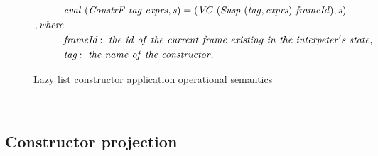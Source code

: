 \documentclass[diploma]{softlab-thesis}
\begin{document}
\begin{figure}[h]
  \begin{align*}
    & \mathit{eval \hfill\ (ConstrF \hfill\ tag \hfill\ exprs, s) = (VC \hfill\ (Susp \hfill\ (tag, exprs) \hfill\ frameId), s)} \\
    \mathit{, where} \\
    &  \mathit{\textit{frameId}: \hfill\ the \hfill\ id \hfill\ of \hfill\ the 
    \hfill\ current \hfill\ frame \hfill\ existing \hfill\ in \hfill\ the \hfill\ interpeter's 
    \hfill\ state,} \\
    &  \mathit{\textit{tag}: \hfill\ the \hfill\ name \hfill\ of \hfill\ the \hfill\ 
    constructor.}
  \end{align*}
\caption{Lazy list constructor application operational semantics\label{fig:consAppl}}
\end{figure} ~


\subsection{Constructor projection}
\end{document}
